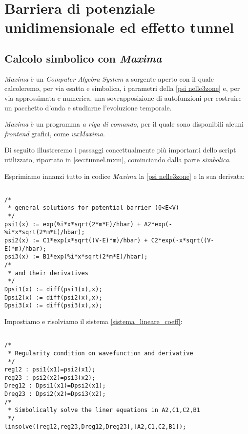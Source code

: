 
\section{Barriera di potenziale unidimensionale ed effetto tunnel}

\subsection{Calcolo simbolico con \emph{Maxima}}

\emph{Maxima}\cite{MAXIMA} è un \emph{Computer Algebra System} a sorgente 
aperto\cite{OPENSOURCE} con il quale calcoleremo, per via esatta e
simbolica, i parametri della \eqref{psi nelle3zone} e, per via
approssimata e numerica, una sovrapposizione di autofunzioni per
costruire un pacchetto d'onda e studiarne l'evoluzione temporale. 

\emph{Maxima} è un programma \emph{a riga di comando}, per il quale
sono disponibili alcuni \emph{frontend} grafici, come 
\emph{wxMaxima}\cite{wxMAXIMA}.

Di seguito illustreremo i passaggi concettualmente più importanti
dello script utilizzato, riportato in \ref{sec:tunnel.mxm}, cominciando
dalla parte \emph{simbolica}.

Esprimiamo innanzi tutto in codice \emph{Maxima} la 
\eqref{psi nelle3zone} e la sua derivata:
\begin{lstlisting}

/* 
 * general solutions for potential barrier (0<E<V) 
 */
psi1(x) := exp(%i*x*sqrt(2*m*E)/hbar) + A2*exp(-%i*x*sqrt(2*m*E)/hbar);
psi2(x) := C1*exp(x*sqrt((V-E)*m)/hbar) + C2*exp(-x*sqrt((V-E)*m)/hbar);
psi3(x) := B1*exp(%i*x*sqrt(2*m*E)/hbar);
/* 
 * and their derivatives 
 */
Dpsi1(x) := diff(psi1(x),x);
Dpsi2(x) := diff(psi2(x),x);
Dpsi3(x) := diff(psi3(x),x);
\end{lstlisting}

Impostiamo e risolviamo il sistema \eqref{sistema_lineare_coeff}:
\begin{lstlisting}

/* 
 * Regularity condition on wavefunction and derivative 
 */
reg12 : psi1(x1)=psi2(x1);
reg23 : psi2(x2)=psi3(x2);
Dreg12 : Dpsi1(x1)=Dpsi2(x1);
Dreg23 : Dpsi2(x2)=Dpsi3(x2);
/*
 * Simbolically solve the liner equations in A2,C1,C2,B1
 */
linsolve([reg12,reg23,Dreg12,Dreg23],[A2,C1,C2,B1]);
\end{lstlisting}

